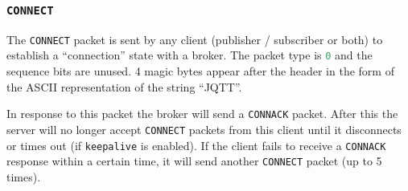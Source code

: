 \documentclass[a4paper]{article}
\numberwithin{figure}{section}
\numberwithin{table}{section}
\newcommand{\mi}{\mintinline}
\begin{document}
\subsubsection{\mi{c}{CONNECT}}
The \mi{c}{CONNECT} packet is sent by any client (publisher / subscriber or both) to establish a ``connection'' state with a broker. The packet type is \mi{c}{0} and the sequence bits are unused. 4 magic bytes appear after the header in the form of the ASCII representation of the string ``JQTT''.

In response to this packet the broker will send a \mi{c}{CONNACK} packet. After this the server will no longer accept \mi{c}{CONNECT} packets from this client until it disconnects or times out (if \mi{c}{keepalive} is enabled). If the client fails to receive a \mi{c}{CONNACK} response within a certain time, it will send another \mi{c}{CONNECT} packet (up to 5 times).

\clearpage
{}
{}
\printbibliography
\end{document}
